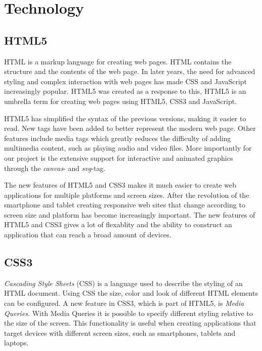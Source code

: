 \chapter{Technology} %

\label{Chapter2} %


\section{HTML5}
HTML is a markup language for creating web pages. HTML contains the structure and the contents of the web page. In later years, the need for advanced styling and complex interaction with web pages has made CSS and JavaScript increasingly popular. HTML5 was created as a response to this, HTML5 is an umbrella term for creating web pages using HTML5, CSS3 and JavaScript.

HTML5 has simplified the syntax of the previous versions, making it easier to read. New tags have been added to better represent the modern web page. Other features include media tags which greatly reduces the difficulty of adding multimedia content, such as playing audio and video files. More importantly for our project is the extensive support for interactive and animated graphics through the \emph{canvas}- and \emph{svg}-tag.

The new features of HTML5 and CSS3 makes it much easier to create web applications for multiple platforms and screen sizes. After the revolution of the smartphone and tablet creating responsive web sites that change according to screen size and platform has become increasingly important. The new features of HTML5 and CSS3 gives a lot of flexablity and the ability to construct an application that can reach a broad amount of devices.


\section{CSS3}
\emph{Cascading Style Sheets} (CSS) is a language used to describe the styling of an HTML document. Using CSS the size, color and look of different HTML elements can be configured. A new feature in CSS3, which is part of HTML5, is \emph{Media Queries}. With Media Queries it is possible to specify different styling relative to the size of the screen. This functionality is useful when creating applications that target devices with different screen sizes, such as smartphones, tablets and laptops. 


